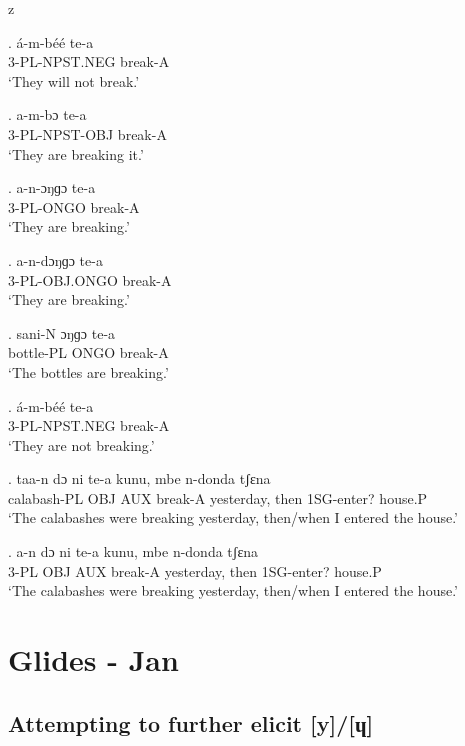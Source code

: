 z   \documentclass{assets/fieldnotes}
\begin{document}
\exg.
á-m-béé         te-a    \\
3-PL-NPST.NEG   break-A \\%
`They will not break.' \label{They will not break}

\exg.
a-m-bɔ              te-a    \\
3-PL-NPST-OBJ   break-A \\%
`They are breaking it.'

\exg.
a-n-ɔŋɡɔ     te-a    \\
3-PL-ONGO   break-A \\%
`They are breaking.'

\exg.
a-n-dɔŋɡɔ    te-a    \\
3-PL-OBJ.ONGO   break-A \\%
`They are breaking.'

\exg.
sani-N      ɔŋɡɔ   te-a    \\
bottle-PL   ONGO   break-A \\%
`The bottles are breaking.' \label{The bottles are breaking}


\exg.
á-m-béé         te-a    \\
3-PL-NPST.NEG   break-A \\%
`They are not breaking.' \label{They are not breaking}


\exg.
taa-n         dɔ    ni    te-a      kunu,        mbe    n-donda      tʃɛna   \\
calabash-PL   OBJ   AUX   break-A   yesterday,   then   1SG-enter?   house.P \\%
`The calabashes were breaking yesterday, then/when I entered the house.'

\exg.
a-n    dɔ    ni    te-a      kunu,        mbe    n-donda      tʃɛna   \\
3-PL   OBJ   AUX   break-A   yesterday,   then   1SG-enter?   house.P \\%
`The calabashes were breaking yesterday, then/when I entered the house.'


\section{Glides - Jan}

\subsection{Attempting to further elicit [y]/[ɥ]}
\end{document}
